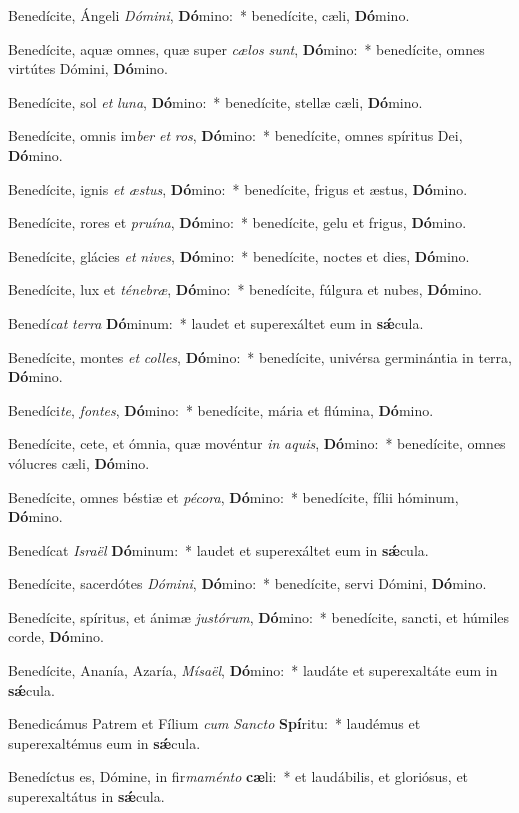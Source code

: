 \item Benedícite, Ángeli \textit{Dó}\textit{mi}\textit{ni}, \textbf{Dó}mino:~* benedícite, cæli, \textbf{Dó}mino.
\item Benedícite, aquæ omnes, quæ super \textit{cæ}\textit{los} \textit{sunt}, \textbf{Dó}mino:~* benedícite, omnes virtútes Dómini, \textbf{Dó}mino.
\item Benedícite, sol \textit{et} \textit{lu}\textit{na}, \textbf{Dó}mino:~* benedícite, stellæ cæli, \textbf{Dó}mino.
\item Benedícite, omnis im\textit{ber} \textit{et} \textit{ros}, \textbf{Dó}mino:~* benedícite, omnes spíritus Dei, \textbf{Dó}mino.
\item Benedícite, ignis \textit{et} \textit{æs}\textit{tus}, \textbf{Dó}mino:~* benedícite, frigus et æstus, \textbf{Dó}mino.
\item Benedícite, rores et \textit{pru}\textit{í}\textit{na}, \textbf{Dó}mino:~* benedícite, gelu et frigus, \textbf{Dó}mino.
\item Benedícite, glácies \textit{et} \textit{ni}\textit{ves}, \textbf{Dó}mino:~* benedícite, noctes et dies, \textbf{Dó}mino.
\item Benedícite, lux et \textit{té}\textit{ne}\textit{bræ}, \textbf{Dó}mino:~* benedícite, fúlgura et nubes, \textbf{Dó}mino.
\item Benedí\textit{cat} \textit{ter}\textit{ra} \textbf{Dó}minum:~* laudet et superexáltet eum in \textbf{sǽ}cula.
\item Benedícite, montes \textit{et} \textit{col}\textit{les}, \textbf{Dó}mino:~* benedícite, univérsa germinántia in terra, \textbf{Dó}mino.
\item Benedíci\textit{te}, \textit{fon}\textit{tes}, \textbf{Dó}mino:~* benedícite, mária et flúmina, \textbf{Dó}mino.
\item Benedícite, cete, et ómnia, quæ movéntur \textit{in} \textit{a}\textit{quis}, \textbf{Dó}mino:~* benedícite, omnes vólucres cæli, \textbf{Dó}mino.
\item Benedícite, omnes béstiæ et \textit{pé}\textit{co}\textit{ra}, \textbf{Dó}mino:~* benedícite, fílii hóminum, \textbf{Dó}mino.
\item Benedícat \textit{Is}\textit{ra}\textit{ël} \textbf{Dó}minum:~* laudet et superexáltet eum in \textbf{sǽ}cula.
\item Benedícite, sacerdótes \textit{Dó}\textit{mi}\textit{ni}, \textbf{Dó}mino:~* benedícite, servi Dómini, \textbf{Dó}mino.
\item Benedícite, spíritus, et ánimæ \textit{jus}\textit{tó}\textit{rum}, \textbf{Dó}mino:~* benedícite, sancti, et húmiles corde, \textbf{Dó}mino.
\item Benedícite, Ananía, Azaría, \textit{Mí}\textit{sa}\textit{ël}, \textbf{Dó}mino:~* laudáte et superexaltáte eum in \textbf{sǽ}cula.
\item Benedicámus Patrem et Fílium \textit{cum} \textit{Sanc}\textit{to} \textbf{Spí}ritu:~* laudémus et superexaltémus eum in \textbf{sǽ}cula.
\item Benedíctus es, Dómine, in fir\textit{ma}\textit{mén}\textit{to} \textbf{cæ}li:~* et laudábilis, et gloriósus, et superexaltátus in \textbf{sǽ}cula.
